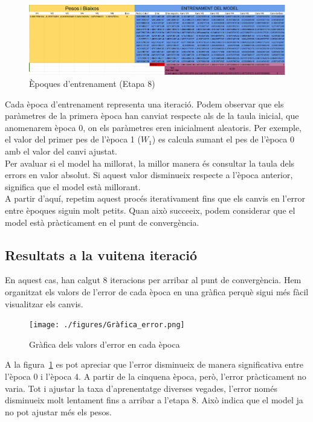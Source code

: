 \begin{figure}[H]
    \centering
    \includegraphics[width=1\textwidth]{./figures/Etapa8.png}
    \caption{Èpoques d'entrenament (Etapa 8)}
\end{figure}

Cada època d’entrenament representa una iteració. Podem observar que els paràmetres de la primera època han canviat respecte als de la taula inicial, que anomenarem època 0, on els paràmetres eren inicialment aleatoris. Per exemple, el valor del primer pes de l’època 1 ($W_1$) es calcula sumant el pes de l’època 0 amb el valor del canvi ajustat.\\

Per avaluar si el model ha millorat, la millor manera és consultar la taula dels errors en valor absolut. Si aquest valor disminueix respecte a l’època anterior, significa que el model està millorant.\\

A partir d’aquí, repetim aquest procés iterativament fins que els canvis en l’error entre èpoques siguin molt petits. Quan això succeeix, podem considerar que el model està pràcticament en el punt de convergència.%
\clearpage
\subsection{Resultats a la vuitena iteració}
En aquest cas, han calgut 8 iteracions per arribar al punt de convergència. Hem organitzat els valors de l'error de cada època en una gràfica perquè sigui més fàcil visualitzar els canvis.

\begin{figure}[h!]
    \centering
    \texttt{[image: ./figures/Gràfica\_error.png]}
    \caption{Gràfica dels valors d'error en cada època}
    \label{f:errorsEpoca}
\end{figure}

A la figura~\ref{f:errorsEpoca} es pot apreciar que l’error disminueix de manera significativa entre l’època 0 i l’època 4. A partir de la cinquena època, però, l’error pràcticament no varia. Tot i ajustar la taxa d’aprenentatge diverses vegades, l’error només disminueix molt lentament fins a arribar a l’etapa 8. Això indica que el model ja no pot ajustar més els pesos.

